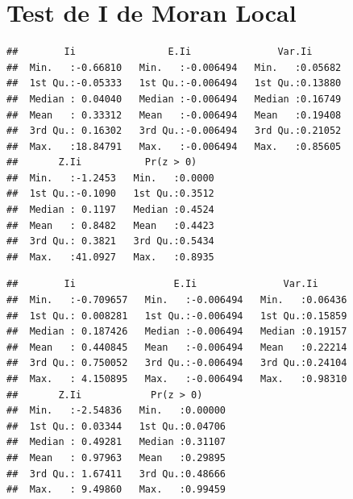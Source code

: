 \documentclass[11pt,]{article}
\newenvironment{Shaded}{\begin{snugshade}}{\end{snugshade}}
\newcommand{\KeywordTok}[1]{\textcolor[rgb]{0.13,0.29,0.53}{\textbf{#1}}}
\newcommand{\DataTypeTok}[1]{\textcolor[rgb]{0.13,0.29,0.53}{#1}}
\newcommand{\StringTok}[1]{\textcolor[rgb]{0.31,0.60,0.02}{#1}}
\newcommand{\OperatorTok}[1]{\textcolor[rgb]{0.81,0.36,0.00}{\textbf{#1}}}
\newcommand{\NormalTok}[1]{#1}
\begin{document}
\section{Test de I de Moran Local}\label{test-de-i-de-moran-local}

\begin{Shaded}
\end{Shaded}

\begin{verbatim}
##        Ii                E.Ii               Var.Ii       
##  Min.   :-0.66810   Min.   :-0.006494   Min.   :0.05682  
##  1st Qu.:-0.05333   1st Qu.:-0.006494   1st Qu.:0.13880  
##  Median : 0.04040   Median :-0.006494   Median :0.16749  
##  Mean   : 0.33312   Mean   :-0.006494   Mean   :0.19408  
##  3rd Qu.: 0.16302   3rd Qu.:-0.006494   3rd Qu.:0.21052  
##  Max.   :18.84791   Max.   :-0.006494   Max.   :0.85605  
##       Z.Ii           Pr(z > 0)     
##  Min.   :-1.2453   Min.   :0.0000  
##  1st Qu.:-0.1090   1st Qu.:0.3512  
##  Median : 0.1197   Median :0.4524  
##  Mean   : 0.8482   Mean   :0.4423  
##  3rd Qu.: 0.3821   3rd Qu.:0.5434  
##  Max.   :41.0927   Max.   :0.8935
\end{verbatim}

\begin{Shaded}
\end{Shaded}

\begin{verbatim}
##        Ii                 E.Ii               Var.Ii       
##  Min.   :-0.709657   Min.   :-0.006494   Min.   :0.06436  
##  1st Qu.: 0.008281   1st Qu.:-0.006494   1st Qu.:0.15859  
##  Median : 0.187426   Median :-0.006494   Median :0.19157  
##  Mean   : 0.440845   Mean   :-0.006494   Mean   :0.22214  
##  3rd Qu.: 0.750052   3rd Qu.:-0.006494   3rd Qu.:0.24104  
##  Max.   : 4.150895   Max.   :-0.006494   Max.   :0.98310  
##       Z.Ii            Pr(z > 0)      
##  Min.   :-2.54836   Min.   :0.00000  
##  1st Qu.: 0.03344   1st Qu.:0.04706  
##  Median : 0.49281   Median :0.31107  
##  Mean   : 0.97963   Mean   :0.29895  
##  3rd Qu.: 1.67411   3rd Qu.:0.48666  
##  Max.   : 9.49860   Max.   :0.99459
\end{verbatim}
\end{document}
